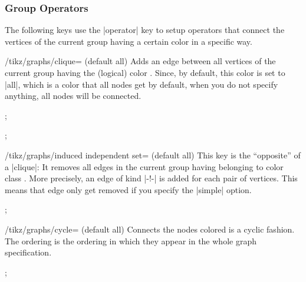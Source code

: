 \subsubsection{Group Operators}

The following keys use the |operator| key to setup operators that
connect the vertices of the current group having a certain color in a
specific way.

\begin{key}{/tikz/graphs/clique= (default all)}
  Adds an edge between all vertices of the current group having the
  (logical) color . Since, by default, this color is set
  to |all|, which is a color that all nodes get by default, when you
  do not specify anything, all nodes will be connected.
\begin{codeexample}[]
\tikz {};    
\end{codeexample}
\begin{codeexample}[]
\tikz {};    
\end{codeexample}
\end{key}

\begin{key}{/tikz/graphs/induced independent set= (default all)}
  This key is the ``opposite'' of a |clique|: It removes all edges in
  the current group having belonging to color class . More
  precisely, an edge of kind |-!-| is added for each pair of
  vertices. This means that edge only get removed if you specify the
  |simple| option.
\begin{codeexample}[]
\tikz {};    
\end{codeexample}
\end{key}


\begin{key}{/tikz/graphs/cycle= (default all)}
  Connects the nodes colored  is a cyclic fashion. The
  ordering is the ordering in which they appear in the whole graph
  specification.
\begin{codeexample}[]
\tikz {};    
\end{codeexample}
\end{key}

